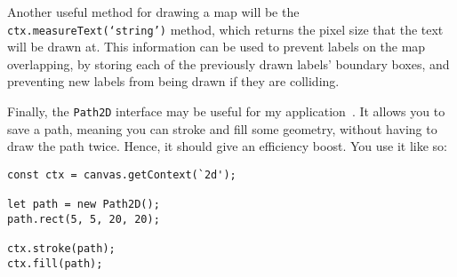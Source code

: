 \documentclass[]{final_report}
\begin{document}
Another useful method for drawing a map will be the \texttt{ctx.measureText(`string')} method, which returns the pixel size that the text will be drawn at. This information can be used to prevent labels on the map overlapping, by storing each of the previously drawn labels' boundary boxes, and preventing new labels from being drawn if they are colliding.

Finally, the \texttt{Path2D} interface may be useful for my application~\cite{mdn-canvas-path-2d}. It allows you to save a path, meaning you can stroke and fill some geometry, without having to draw the path twice. Hence, it should give an efficiency boost. You use it like so:

\begin{Verbatim}
const ctx = canvas.getContext(`2d');

let path = new Path2D();
path.rect(5, 5, 20, 20);

ctx.stroke(path);
ctx.fill(path);
\end{Verbatim}


\printbibliography{}
\end{document}
